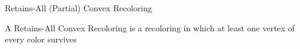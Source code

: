 \begin{frame}{Retains-All (Partial) Convex Recoloring}

\begin{definition}
A \alert{Retains-All Convex Recoloring} 
is a recoloring in which at least one vertex of every color survives 
\end{definition}

\end{frame}
